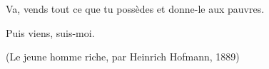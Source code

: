 Va, vends tout ce que tu possèdes et donne-le aux pauvres.\par Puis viens, suis-moi.\par
(Le jeune homme riche, par Heinrich Hofmann, 1889)
